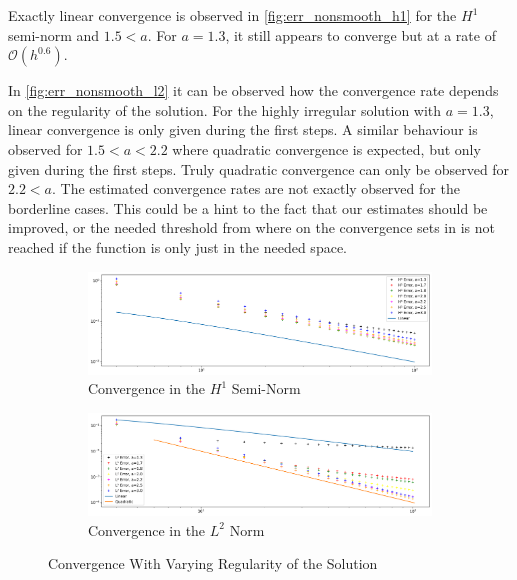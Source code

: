 \documentclass[11pt,a4paper]{article}
\begin{document}
\begin{multicols}{2}
Exactly linear convergence is observed in \autoref{fig:err_nonsmooth_h1} for the $H^1$ semi-norm and $1.5 < a$.
For $a = 1.3$, it still appears to converge but at a rate of $\mathcal{O}\left(h^{0.6}\right)$.

In \autoref{fig:err_nonsmooth_l2} it can be observed how the convergence rate depends on the regularity of the solution.
For the highly irregular solution with $a = 1.3$, linear convergence is only given during the first steps.
A similar behaviour is observed for $1.5 < a < 2.2$ where quadratic convergence is expected, but only given
during the first steps.
Truly quadratic convergence can only be observed for $2.2 < a$.
The estimated convergence rates are not exactly observed for the borderline cases.
This could be a hint to the fact that our estimates should be improved, or the needed threshold from where on the
convergence sets in is not reached if the function is only just in the needed space.

\begin{figure}[H]
  \centering
  \begin{subfigure}{1\linewidth}
    \centering
    \includegraphics[width=.8\linewidth]{errors_nonsmooth_h1}
    \caption{Convergence in the $H^1$ Semi-Norm}
    \label{fig:err_nonsmooth_h1}
  \end{subfigure}

  \begin{subfigure}{1\linewidth}
    \centering
    \includegraphics[width=.8\linewidth]{errors_nonsmooth_l2}
    \caption{Convergence in the $L^2$ Norm}
    \label{fig:err_nonsmooth_l2}
  \end{subfigure}
  \caption{Convergence With Varying Regularity of the Solution}
\end{figure}



\end{multicols}
\end{document}

